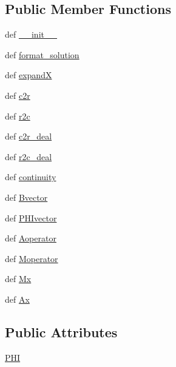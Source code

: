 \subsection*{Public Member Functions}
\begin{DoxyCompactItemize}
\item 
def \hyperlink{classDropbox_1_1ThreeLayerModel_1_1TLM_1_1S1Dmodel_a9dd504b67e8d638c31c737ec52762376}{\+\_\+\+\_\+init\+\_\+\+\_\+}
\item 
def \hyperlink{classDropbox_1_1ThreeLayerModel_1_1TLM_1_1S1Dmodel_a15a71eb79508d9f34371b27b79822cc2}{format\+\_\+solution}
\item 
def \hyperlink{classDropbox_1_1ThreeLayerModel_1_1TLM_1_1S1Dmodel_a41d4c2ebea8650d0253d93b738b9e6a7}{expand\+X}
\item 
def \hyperlink{classDropbox_1_1ThreeLayerModel_1_1TLM_1_1S1Dmodel_adb09392ed4fec29749c493ac0f29ca4d}{c2r}
\item 
def \hyperlink{classDropbox_1_1ThreeLayerModel_1_1TLM_1_1S1Dmodel_a037a9f48dc97d9c80925d2b3b85abb9c}{r2c}
\item 
def \hyperlink{classDropbox_1_1ThreeLayerModel_1_1TLM_1_1S1Dmodel_a7dee3595d92352cfbe729a99fe233531}{c2r\+\_\+deal}
\item 
def \hyperlink{classDropbox_1_1ThreeLayerModel_1_1TLM_1_1S1Dmodel_a07e444e9445cd1e64d8f60df0a6e1034}{r2c\+\_\+deal}
\item 
def \hyperlink{classDropbox_1_1ThreeLayerModel_1_1TLM_1_1S1Dmodel_abdd04e48b2523dc5e3778eddcd81e6f9}{continuity}
\item 
def \hyperlink{classDropbox_1_1ThreeLayerModel_1_1TLM_1_1S1Dmodel_a668128cad8b3cc1b14d1ebd75e3e1cc8}{Bvector}
\item 
def \hyperlink{classDropbox_1_1ThreeLayerModel_1_1TLM_1_1S1Dmodel_a58a5277d661101ce7f0c0a80366667bb}{P\+H\+Ivector}
\item 
def \hyperlink{classDropbox_1_1ThreeLayerModel_1_1TLM_1_1S1Dmodel_ae6146a67dfc1e49dc1fb080a41cfa19a}{Aoperator}
\item 
def \hyperlink{classDropbox_1_1ThreeLayerModel_1_1TLM_1_1S1Dmodel_a7e305e46f4bb027807c7e478edf2750e}{Moperator}
\item 
def \hyperlink{classDropbox_1_1ThreeLayerModel_1_1TLM_1_1S1Dmodel_a577d8bbb50b20f21d505c7ad086083a9}{Mx}
\item 
def \hyperlink{classDropbox_1_1ThreeLayerModel_1_1TLM_1_1S1Dmodel_acadc0bf73cd56a96a53eabbabd17fceb}{Ax}
\end{DoxyCompactItemize}
\subsection*{Public Attributes}
\begin{DoxyCompactItemize}
\item 
\hyperlink{classDropbox_1_1ThreeLayerModel_1_1TLM_1_1S1Dmodel_a498caac838b8c8bdf4018a2e4efb9a27}{P\+H\+I}
\end{DoxyCompactItemize}


